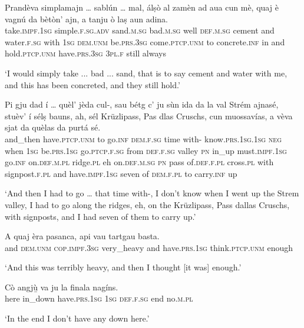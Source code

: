 \begin{linenumbers}
\gll  Prandèva simplamajn … sablún … mal, álṣò al zamèn ad aua cun mè, quaj è vagnú da bètòn’ ajn, a tanju ò laṣ aun adina. \\
 take.\textsc{impf.1sg} simple.\textsc{f.sg.adv} {} sand.\textsc{m.sg} {} bad.\textsc{m.sg} well \textsc{def.m.sg} cement and water.\textsc{f.sg} with \textsc{1sg} \textsc{dem.unm} be.\textsc{prs.3sg} come.\textsc{ptcp.unm} to concrete.\textsc{inf} in and hold.\textsc{ptcp.unm} have.\textsc{prs.3sg} \textsc{3pl.f} still always \\
\end{linenumbers}
\medskip
\glt `I would simply take ... bad ... sand, that is to say cement and water with me, and this has been concreted, and they still hold.'
\medskip

\begin{linenumbers}
\gll  Pi gju dad í … quèl’ jèda cul-, sau bétg c’ ju sùn ida da la val Strém ajnasé, stuèv’ í sélṣ bauns, ah, sél Krüzlipass, Pas dlas Cruschs, cun muossavías, a vèva sjat da quèlas da purtá sé.  \\
and\_then have.\textsc{ptcp.unm} to go.\textsc{inf} {} \textsc{dem.f.sg} time  with- know.\textsc{prs.1sg.1sg} \textsc{neg} when \textsc{1sg} be.\textsc{prs.1sg} go.\textsc{ptcp.f.sg} from \textsc{def.f.sg} valley \textsc{pn} in\_up must.\textsc{impf.1sg} go.\textsc{inf} on.\textsc{def.m.pl} ridge.\textsc{pl} eh on.\textsc{def.m.sg} \textsc{pn} pass of.\textsc{def.f.pl} cross.\textsc{pl} with signpost.\textsc{f.pl} and have.\textsc{impf.1sg} seven of  \textsc{dem.f.pl} to carry.\textsc{inf} up \\
\end{linenumbers}
\medskip
\glt `And then I had to go … that time with-, I don’t know when I went up the Strem valley, I had to go along the ridges, eh, on the Krüzlipass, Pass dallas Cruschs, with signposts, and I had seven of them to carry up.'
\medskip

\begin{linenumbers}
\gll  A quaj èra pasanca, api vau tartgau basta.  \\
and \textsc{dem.unm} \textsc{cop.impf.3sg} very\_heavy and have.\textsc{prs.1sg} think.\textsc{ptcp.unm} enough  \\
\end{linenumbers}
\medskip
\glt `And this was terribly heavy, and then I thought [it was] enough.'
\medskip

\begin{linenumbers}
\gll  Cò angjù̱ va ju la finala nagíns.  \\
here in\_down have.\textsc{prs.1sg} \textsc{1sg} \textsc{def.f.sg} end no.\textsc{m.pl}  \\
\end{linenumbers}
\medskip
\glt `In the end I don’t have any down here.'
\medskip

